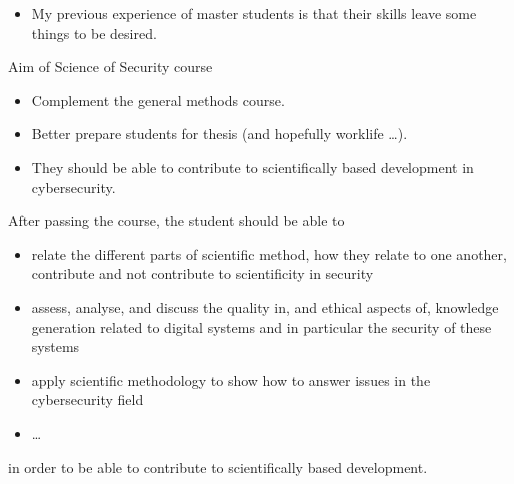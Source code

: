 \begin{frame}
  \begin{remark}
    \begin{itemize}
      \item My previous experience of master students is that their skills 
        leave some things to be desired.
    \end{itemize}
  \end{remark}

  \pause

  \begin{block}{Aim of Science of Security course}
    \begin{itemize}
      \item Complement the general methods course.
      \item Better prepare students for thesis (and hopefully worklife \dots).
      \item They should be able to contribute to scientifically based 
        development in cybersecurity.
    \end{itemize}
  \end{block}
\end{frame}

\begin{frame}[fragile]
  After passing the course, the student should be able to
  \begin{itemize}
    \item<+> relate the different parts of scientific method, how they relate 
      to one another, contribute and not contribute to scientificity in 
      security
    \item<+> assess, analyse, and discuss the quality in, and ethical aspects 
      of, knowledge generation related to digital systems and in particular the 
      security of these systems
    \item<+> apply scientific methodology to show how to answer issues in the 
      cybersecurity field
    \item<+> \dots
  \end{itemize}
  in order to be able to contribute to scientifically based development.
\end{frame}


